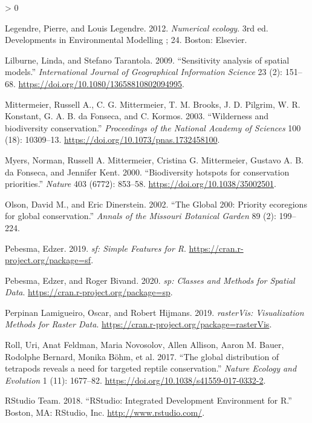 \documentclass[
]{article}
\newlength{\cslhangindent}
\newenvironment{CSLReferences}[2] %
 {%
  \setlength{\parindent}{0pt}
  \ifodd #1 \everypar{\setlength{\hangindent}{\cslhangindent}}\ignorespaces\fi
  \ifnum #2 > 0
  \setlength{\parskip}{#2\baselineskip}
  \fi
 }%
 {}
\begin{document}
\begin{CSLReferences}{1}{0}
\leavevmode\hypertarget{ref-Legendre2012}{}%
Legendre, Pierre, and Louis Legendre. 2012. \emph{{Numerical ecology}}. 3rd ed. Developments in Environmental Modelling ; 24. Boston: Elsevier.

\leavevmode\hypertarget{ref-Lilburne2009}{}%
Lilburne, Linda, and Stefano Tarantola. 2009. {``{Sensitivity analysis of spatial models}.''} \emph{International Journal of Geographical Information Science} 23 (2): 151--68. \url{https://doi.org/10.1080/13658810802094995}.

\leavevmode\hypertarget{ref-Mittermeier2003}{}%
Mittermeier, Russell A., C. G. Mittermeier, T. M. Brooks, J. D. Pilgrim, W. R. Konstant, G. A. B. da Fonseca, and C. Kormos. 2003. {``{Wilderness and biodiversity conservation}.''} \emph{Proceedings of the National Academy of Sciences} 100 (18): 10309--13. \url{https://doi.org/10.1073/pnas.1732458100}.

\leavevmode\hypertarget{ref-Myers2000}{}%
Myers, Norman, Russell A. Mittermeier, Cristina G. Mittermeier, Gustavo A. B. da Fonseca, and Jennifer Kent. 2000. {``{Biodiversity hotspots for conservation priorities}.''} \emph{Nature} 403 (6772): 853--58. \url{https://doi.org/10.1038/35002501}.

\leavevmode\hypertarget{ref-Olson2002}{}%
Olson, David M., and Eric Dinerstein. 2002. {``{The Global 200: Priority ecoregions for global conservation}.''} \emph{Annals of the Missouri Botanical Garden} 89 (2): 199--224.

\leavevmode\hypertarget{ref-R-sf}{}%
Pebesma, Edzer. 2019. \emph{{sf: Simple Features for R}}. \url{https://cran.r-project.org/package=sf}.

\leavevmode\hypertarget{ref-R-sp}{}%
Pebesma, Edzer, and Roger Bivand. 2020. \emph{{sp: Classes and Methods for Spatial Data}}. \url{https://cran.r-project.org/package=sp}.

\leavevmode\hypertarget{ref-R-rasterVis}{}%
Perpinan Lamigueiro, Oscar, and Robert Hijmans. 2019. \emph{{rasterVis: Visualization Methods for Raster Data}}. \url{https://cran.r-project.org/package=rasterVis}.

\leavevmode\hypertarget{ref-Roll2017}{}%
Roll, Uri, Anat Feldman, Maria Novosolov, Allen Allison, Aaron M. Bauer, Rodolphe Bernard, Monika Böhm, et al. 2017. {``{The global distribution of tetrapods reveals a need for targeted reptile conservation}.''} \emph{Nature Ecology and Evolution} 1 (11): 1677--82. \url{https://doi.org/10.1038/s41559-017-0332-2}.

\leavevmode\hypertarget{ref-RStudioTeam2018}{}%
RStudio Team. 2018. {``{RStudio: Integrated Development Environment for R}.''} Boston, MA: RStudio, Inc. \url{http://www.rstudio.com/}.


\end{CSLReferences}
\end{document}
